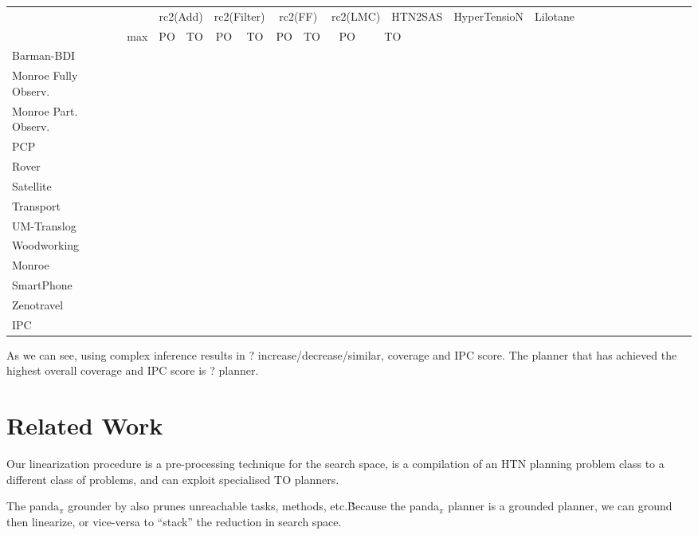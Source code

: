 \documentclass[letterpaper]{article} %
\begin{document}
\begin{table}[h]
	\scalebox{0.4} {
		\begin{tabular}{lccccccccccccccccccccccccl} 
			\toprule 
			&& \multicolumn{2}{c}{rc2(Add)} & \multicolumn{2}{c}{rc2(Filter)} & \multicolumn{2}{c}{rc2(FF)} & \multicolumn{2}{c}{rc2(LMC)}  & \multicolumn{2}{c}{HTN2SAS} & \multicolumn{2}{c}{HyperTensioN} & \multicolumn{2}{c}{Lilotane} \\ 
			\cmidrule(lr){3-4} \cmidrule(lr){5-6} \cmidrule(lr){7-8} \cmidrule(lr){9-10} \cmidrule(lr){11-12}  \cmidrule(lr){13-14} \cmidrule(lr){15-16}    
			& max &PO & TO & PO & TO & PO & TO & PO &\multicolumn{2}{c}{ TO  }  \\ 
			\midrule 
			Barman-BDI  \\ 
			Monroe Fully Observ. \\ 
			Monroe Part. Observ. \\ 
			PCP\\ 
			Rover  \\ 
			Satellite  \\ 
			Transport \\ 
			UM-Translog \\ 
			Woodworking \\ 
			\midrule 
			Monroe  \\ 
			SmartPhone \\ 
			Zenotravel \\ 
			\midrule 
			IPC \\
			\bottomrule
		\end{tabular} 	
	}
\end{table}

\newpage
As we can see, using complex inference results in ?  increase/decrease/similar, coverage and IPC score.
The planner that has achieved the highest overall coverage and IPC score is ? planner.


\section{Related Work}
Our linearization procedure is a pre-processing technique for the search space, is a compilation of an HTN planning problem class to a different class of problems, and can exploit specialised TO planners.

The panda$_\pi$ grounder by \cite{Behnke2020Grounding} also prunes unreachable tasks, methods, etc.\.  Because the panda$_{\pi}$ planner is a grounded planner, we can ground then linearize, or vice-versa to \enquote{stack} the reduction in search space.
\end{document}
